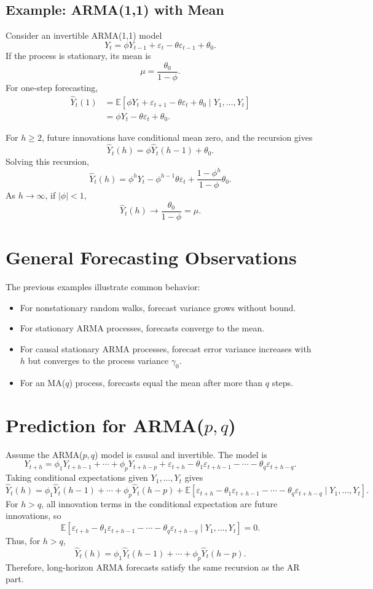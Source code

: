 \documentclass[12pt,oneside]{book}
\numberwithin{equation}{section}
\theoremstyle{definition}
\theoremstyle{plain}
\theoremstyle{remark}
\newcommand{\E}{\mathbb{E}}
\begin{document}
\subsection{Example: ARMA(1,1) with Mean}

Consider an invertible ARMA(1,1) model
\[
Y_t=\phi Y_{t-1}+\varepsilon_t-\theta\varepsilon_{t-1}+\theta_0.
\]
If the process is stationary, its mean is
\[
\mu=\frac{\theta_0}{1-\phi}.
\]
For one-step forecasting,
\begin{align*}
\widehat{Y}_t(1)
&=
\E[\phi Y_t+\varepsilon_{t+1}-\theta\varepsilon_t+\theta_0\mid Y_1,\ldots,Y_t] \\
&=
\phi Y_t-\theta\varepsilon_t+\theta_0.
\end{align*}

For $h\geq 2$, future innovations have conditional mean zero, and the recursion gives
\[
\widehat{Y}_t(h)
=
\phi\widehat{Y}_t(h-1)+\theta_0.
\]
Solving this recursion,
\[
\widehat{Y}_t(h)
=
\phi^hY_t-\phi^{h-1}\theta\varepsilon_t
+
\frac{1-\phi^h}{1-\phi}\theta_0.
\]
As $h\to\infty$, if $|\phi|<1$,
\[
\widehat{Y}_t(h)\to \frac{\theta_0}{1-\phi}=\mu.
\]

\section*{General Forecasting Observations}

The previous examples illustrate common behavior:

\begin{itemize}
\item For nonstationary random walks, forecast variance grows without bound.
\item For stationary ARMA processes, forecasts converge to the mean.
\item For causal stationary ARMA processes, forecast error variance increases with $h$ but converges to the process variance $\gamma_0$.
\item For an MA($q$) process, forecasts equal the mean after more than $q$ steps.
\end{itemize}

\section{Prediction for ARMA($p,q$)}

Assume the ARMA($p,q$) model is causal and invertible. The model is
\[
Y_{t+h}
=
\phi_1Y_{t+h-1}
+\cdots+
\phi_pY_{t+h-p}
+
\varepsilon_{t+h}
-\theta_1\varepsilon_{t+h-1}
-\cdots-
\theta_q\varepsilon_{t+h-q}.
\]
Taking conditional expectations given $Y_1,\ldots,Y_t$ gives
\[
\widehat{Y}_t(h)
=
\phi_1\widehat{Y}_t(h-1)
+\cdots+
\phi_p\widehat{Y}_t(h-p)
+
\E[\varepsilon_{t+h}-\theta_1\varepsilon_{t+h-1}-\cdots-\theta_q\varepsilon_{t+h-q}\mid Y_1,\ldots,Y_t].
\]
For $h>q$, all innovation terms in the conditional expectation are future innovations, so
\[
\E[\varepsilon_{t+h}-\theta_1\varepsilon_{t+h-1}-\cdots-\theta_q\varepsilon_{t+h-q}\mid Y_1,\ldots,Y_t]=0.
\]
Thus, for $h>q$,
\[
\widehat{Y}_t(h)
=
\phi_1\widehat{Y}_t(h-1)
+\cdots+
\phi_p\widehat{Y}_t(h-p).
\]
Therefore, long-horizon ARMA forecasts satisfy the same recursion as the AR part.
\end{document}
